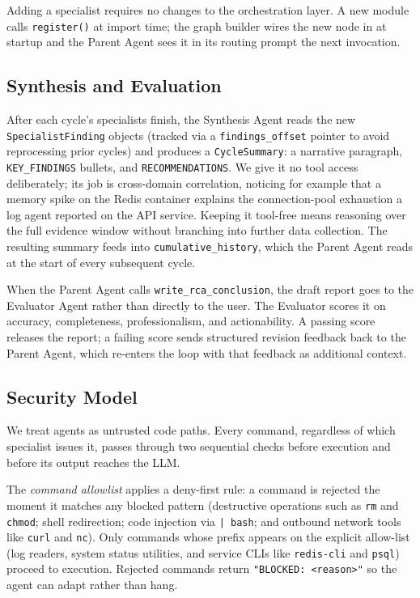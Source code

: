 \documentclass[conference]{IEEEtran}
\begin{document}
Adding a specialist requires no changes to the orchestration layer.
A new module calls \texttt{register()} at import time; the graph
builder wires the new node in at startup and the Parent Agent sees it
in its routing prompt the next invocation.

\subsection{Synthesis and Evaluation}

After each cycle's specialists finish, the Synthesis Agent reads the
new \texttt{SpecialistFinding} objects (tracked via a
\texttt{findings\_offset} pointer to avoid reprocessing prior cycles)
and produces a \texttt{CycleSummary}: a narrative paragraph,
\texttt{KEY\_FINDINGS} bullets, and \texttt{RECOMMENDATIONS}. We give
it no tool access deliberately; its job is cross-domain correlation,
noticing for example that a memory spike on the Redis container
explains the connection-pool exhaustion a log agent reported on the
API service. Keeping it tool-free means reasoning over the full
evidence window without branching into further data collection.
The resulting summary feeds into \texttt{cumulative\_history}, which
the Parent Agent reads at the start of every subsequent cycle.

When the Parent Agent calls \texttt{write\_rca\_conclusion}, the draft
report goes to the Evaluator Agent rather than directly to the user.
The Evaluator scores it on accuracy, completeness, professionalism,
and actionability. A passing score releases the report; a failing
score sends structured revision feedback back to the Parent Agent,
which re-enters the loop with that feedback as additional context.

\subsection{Security Model}

We treat agents as untrusted code paths. Every command, regardless of
which specialist issues it, passes through two sequential checks before
execution and before its output reaches the LLM.

The \textit{command allowlist} applies a deny-first rule: a command is
rejected the moment it matches any blocked pattern (destructive
operations such as \texttt{rm} and \texttt{chmod}; shell redirection;
code injection via \texttt{| bash}; and outbound network tools like
\texttt{curl} and \texttt{nc}). Only commands whose prefix appears on
the explicit allow-list (log readers, system status utilities, and
service CLIs like \texttt{redis-cli} and \texttt{psql}) proceed to
execution. Rejected commands return \texttt{"BLOCKED: <reason>"} so
the agent can adapt rather than hang.
\end{document}
